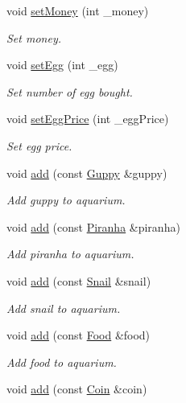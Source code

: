 \begin{DoxyCompactItemize}
void \mbox{\hyperlink{class_aquarium_a6a29945548af2f7cdf9b6cb07e83b41f}{set\+Money}} (int \+\_\+money)
\begin{DoxyCompactList}\small\item\em Set money. \end{DoxyCompactList}\item 
void \mbox{\hyperlink{class_aquarium_aa9398d7691f5c443459d4b38a9be5483}{set\+Egg}} (int \+\_\+egg)
\begin{DoxyCompactList}\small\item\em Set number of egg bought. \end{DoxyCompactList}\item 
void \mbox{\hyperlink{class_aquarium_a08863cdaa6016dccc8e35be9171be652}{set\+Egg\+Price}} (int \+\_\+egg\+Price)
\begin{DoxyCompactList}\small\item\em Set egg price. \end{DoxyCompactList}\item 
void \mbox{\hyperlink{class_aquarium_a320872320862a83e64bc85b895efc21f}{add}} (const \mbox{\hyperlink{class_guppy}{Guppy}} \&guppy)
\begin{DoxyCompactList}\small\item\em Add guppy to aquarium. \end{DoxyCompactList}\item 
void \mbox{\hyperlink{class_aquarium_ad9d2de6ec229fdcdec009bc9a641fe98}{add}} (const \mbox{\hyperlink{class_piranha}{Piranha}} \&piranha)
\begin{DoxyCompactList}\small\item\em Add piranha to aquarium. \end{DoxyCompactList}\item 
void \mbox{\hyperlink{class_aquarium_a9189f6891d0f9012515de3d7e4e765fe}{add}} (const \mbox{\hyperlink{class_snail}{Snail}} \&snail)
\begin{DoxyCompactList}\small\item\em Add snail to aquarium. \end{DoxyCompactList}\item 
void \mbox{\hyperlink{class_aquarium_a0eb7a1a387c68485088cbd7a161257cd}{add}} (const \mbox{\hyperlink{class_food}{Food}} \&food)
\begin{DoxyCompactList}\small\item\em Add food to aquarium. \end{DoxyCompactList}\item 
void \mbox{\hyperlink{class_aquarium_ade3137910efb46f7d47a86a1cff0716b}{add}} (const \mbox{\hyperlink{class_coin}{Coin}} \&coin)

\end{DoxyCompactItemize}
